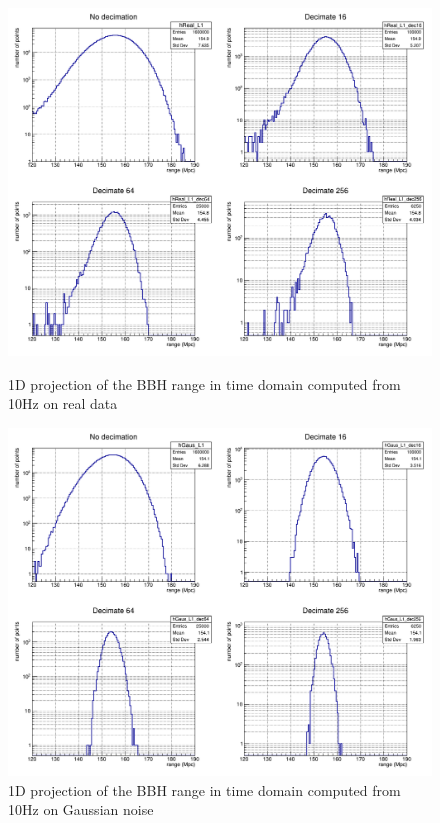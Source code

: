 \begin{figure}
  \centering
  \begin{minipage}{\linewidth}
    \centering
    \includegraphics[width=0.7\linewidth]{sectionBadTriggers/PSD/Range/range_PSD/c1DReal_L1.png}
    \caption{1D projection of the BBH range in time domain computed from 10Hz on real data}
    \label{fig:rangeReal_BBH_10_1D}
  \end{minipage}
  \hfill
  \vspace{0.4cm}
  \begin{minipage}{\linewidth}
    \centering
    \includegraphics[width=0.7\linewidth]{sectionBadTriggers/PSD/Range/range_PSD/c1DGaus_L1.png}
    \caption{1D projection of the BBH range in time domain computed from 10Hz on Gaussian noise}
    \label{fig:rangeGaus_BBH_10_1D}
  \end{minipage}
\end{figure}

